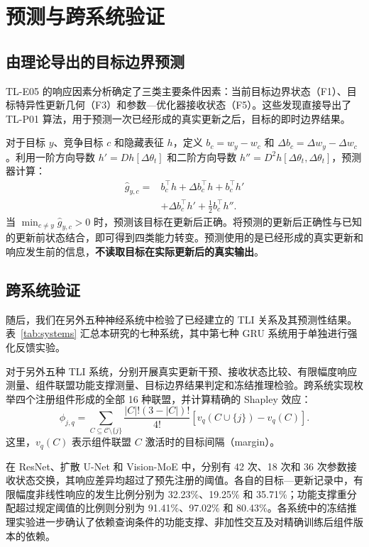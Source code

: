 \section{预测与跨系统验证}

\subsection{由理论导出的目标边界预测}

TL-E05 的响应因素分析确定了三类主要条件因素：当前目标边界状态（F1）、目标特异性更新几何（F3）和参数—优化器接收状态（F5）。这些发现直接导出了 TL-P01 算法，用于预测一次已经形成的真实更新之后，目标的即时边界结果。

对于目标 $y$、竞争目标 $c$ 和隐藏表征 $h$，定义 $b_c=w_y-w_c$ 和 $\Delta b_c=\Delta w_y-\Delta w_c$。利用一阶方向导数 $h'=Dh[\Delta\theta_t]$ 和二阶方向导数 $h''=D^2h[\Delta\theta_t,\Delta\theta_t]$，预测器计算：
\begin{equation}
 \begin{aligned}
 \widehat g_{y,c}={}&b_c^\top h+\Delta b_c^\top h+b_c^\top h'\\
 &+\Delta b_c^\top h'+\tfrac12 b_c^\top h''.
 \end{aligned}
 \label{eq:predict}
\end{equation}
当 $\min_{c\ne y}\widehat g_{y,c}>0$ 时，预测该目标在更新后正确。将预测的更新后正确性与已知的更新前状态结合，即可得到四类能力转变。预测使用的是已经形成的真实更新和响应发生前的信息，\textbf{不读取目标在实际更新后的真实输出}。

\subsection{跨系统验证}

随后，我们在另外五种神经系统中检验了已经建立的 TLI 关系及其预测性结果。表~\ref{tab:systems} 汇总本研究的七种系统，其中第七种 GRU 系统用于单独进行强化反馈实验。

对于另外五种 TLI 系统，分别开展真实更新干预、接收状态比较、有限幅度响应测量、组件联盟功能支撑测量、目标边界结果判定和冻结推理检验。跨系统实现枚举四个注册组件形成的全部 16 种联盟，并计算精确的 Shapley 效应：
\begin{equation}
 \phi_{j,q}=\!\!\sum_{C\subseteq\mathcal C\setminus\{j\}}
 \frac{|C|!(3-|C|)!}{4!}\left[v_q(C\cup\{j\})-v_q(C)\right].
 \label{eq:shapley}
\end{equation}
这里，$v_q(C)$ 表示组件联盟 $C$ 激活时的目标间隔（margin）。

在 ResNet、扩散 U-Net 和 Vision-MoE 中，分别有 42 次、18 次和 36 次参数接收状态交换，其响应差异均超过了预先注册的阈值。各自的目标—更新记录中，有限幅度非线性响应的发生比例分别为 32.23\%、19.25\% 和 35.71\%；功能支撑重分配超过规定阈值的比例则分别为 91.41\%、97.02\% 和 80.43\%。各系统中的冻结推理实验进一步确认了依赖查询条件的功能支撑、非加性交互及对精确训练后组件版本的依赖。

